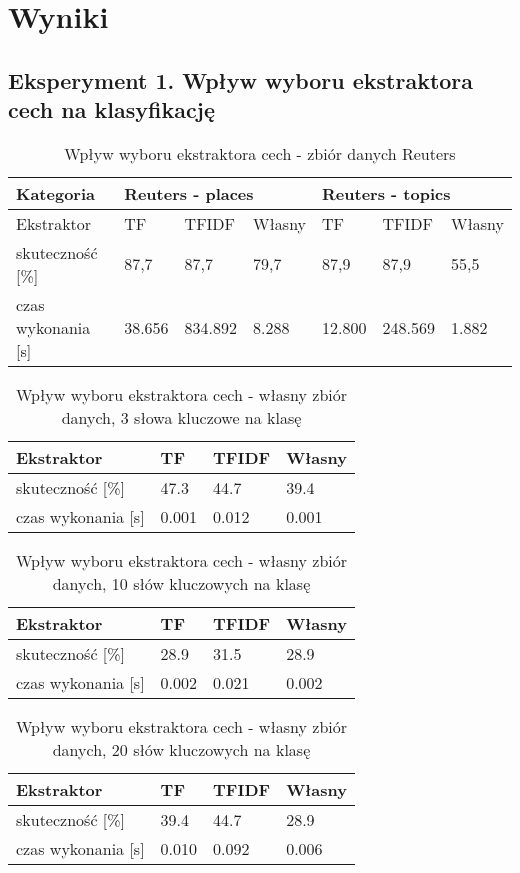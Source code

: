 \documentclass{classrep}
\begin{document}
\section{Wyniki}
\subsection{Eksperyment 1. Wpływ wyboru ekstraktora cech na klasyfikację}
\begin{table}[h]
	\caption{Wpływ wyboru ekstraktora cech - zbiór danych Reuters}
	\begin{tabular}{l|l|l|l|l|l|l}
		Kategoria& \multicolumn{3}{|l}{ Reuters - places} 	& \multicolumn{3}{|l}{ Reuters - topics}\\
		\hline
		Ekstraktor& TF & TFIDF & Własny & TF & TFIDF & Własny\\
		\hline
		skuteczność [\%]   &87,7&87,7&79,7&87,9&87,9&55,5\\
		czas wykonania [s] &38.656&834.892&8.288&12.800&248.569&1.882\\
	\end{tabular}
\end{table}
\begin{table}[h]
	\centering
	\caption{Wpływ wyboru ekstraktora cech - własny zbiór danych, 3 słowa kluczowe na klasę}
	\begin{tabular}{l|l|l|l}
		Ekstraktor& TF & TFIDF & Własny\\
		\hline
		skuteczność [\%]   &47.3&44.7&39.4\\
		czas wykonania [s] &0.001&0.012&0.001\\
	\end{tabular}
\end{table}
\begin{table}[h]
	\centering
\caption{Wpływ wyboru ekstraktora cech - własny zbiór danych, 10 słów kluczowych na klasę}
	\begin{tabular}{l|l|l|l}
		Ekstraktor& TF & TFIDF & Własny\\
		\hline
		skuteczność [\%]   &28.9&31.5&28.9\\
		czas wykonania [s] &0.002&0.021&0.002\\
	\end{tabular}
\end{table}
\begin{table}[h]
	\centering
	\caption{Wpływ wyboru ekstraktora cech - własny zbiór danych, 20 słów kluczowych na klasę}
	\begin{tabular}{l|l|l|l}
		Ekstraktor& TF & TFIDF & Własny\\
		\hline
		skuteczność [\%]   &39.4&44.7&28.9\\
		czas wykonania [s] &0.010&0.092&0.006\\
	\end{tabular}
\end{table}
\newpage
\end{document}
